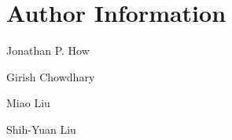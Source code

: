 \section{Author Information}

\noindent Jonathan P. How %


\noindent Girish Chowdhary %


\noindent Miao Liu %

\noindent Shih-Yuan Liu
